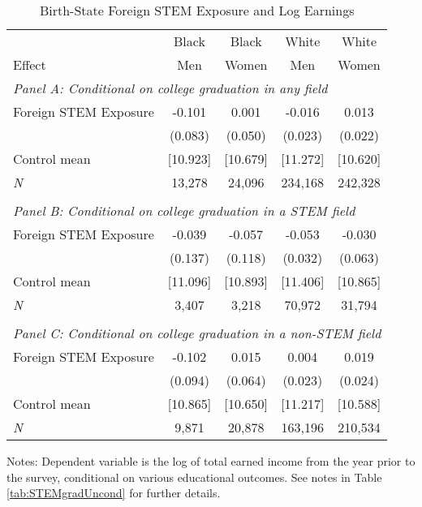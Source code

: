 \begin{table}[ht]
\caption{Birth-State Foreign STEM Exposure and Log Earnings}
\label{tab:logEarnings}
\centering
\begin{threeparttable}
\begin{tabular}{lcccc}
\toprule 
       & Black           & Black        & White        & White       \\
Effect & Men             & Women        & Men          & Women       \\
\midrule 
\multicolumn{5}{l}{\emph{Panel A: Conditional on college graduation in any field}}\\ 
Foreign STEM Exposure & -0.101  & 0.001  & -0.016  & 0.013  \\ 
 &  (0.083) & (0.050) & (0.023) & (0.022) \\ 
Control mean &  [10.923] & [10.679] & [11.272] & [10.620] \\ 
\emph{N} &     13,278 &    24,096 &   234,168 &   242,328 \\ 
&&&&\\
\multicolumn{5}{l}{\emph{Panel B: Conditional on college graduation in a STEM field}}\\ 
Foreign STEM Exposure & -0.039  & -0.057  & -0.053  & -0.030  \\ 
 &  (0.137) & (0.118) & (0.032) & (0.063) \\ 
Control mean &  [11.096] & [10.893] & [11.406] & [10.865] \\ 
\emph{N} &      3,407 &     3,218 &    70,972 &    31,794 \\ 
&&&&\\
\multicolumn{5}{l}{\emph{Panel C: Conditional on college graduation in a non-STEM field}}\\ 
Foreign STEM Exposure & -0.102  & 0.015  & 0.004  & 0.019  \\ 
 &  (0.094) & (0.064) & (0.023) & (0.024) \\ 
Control mean &  [10.865] & [10.650] & [11.217] & [10.588] \\ 
\emph{N} &      9,871 &    20,878 &   163,196 &   210,534 \\ 
\bottomrule 
\end{tabular} 
\footnotesize Notes: Dependent variable is the log of total earned income from the year prior to the survey, conditional on various educational outcomes. See notes in Table \ref{tab:STEMgradUncond} for further details.
\end{threeparttable} 
\end{table} 
